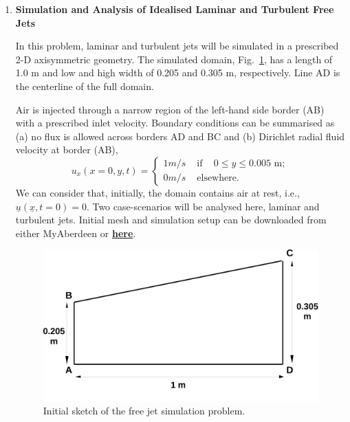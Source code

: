 \documentclass[12pts,a4paper,amsmath,amssymb,floatfix]{article}%
\renewcommand\leq{\leqslant}
\begin{document}
\begin{enumerate}[label=\bfseries Problem \arabic*:]
   \item\label{Problem1} {\bf Simulation and Analysis of Idealised Laminar and Turbulent Free Jets}

In this problem, laminar and turbulent jets will be simulated in a prescribed 2-D axisymmetric geometry. The simulated domain, Fig.~\ref{EG501V_Assignment:Sketch1}, has a length of 1.0 m and low and high width of 0.205 and 0.305 m, respectively. Line AD is the centerline of the full domain. 

          Air is injected through a narrow region of the left-hand side border (AB) with a prescribed inlet velocity. Boundary conditions can be summarised as (a) no flux is allowed across borders AD and BC and (b) Dirichlet radial fluid velocity at border (AB),
         \[ u_{x}( x=0, y, t) = \begin{cases}
             1 m/s & \text{ if } \;\;\;0\leq y\leq 0.005 \text{ m}; \\
             0 m/s & \text{ elsewhere.}
         \end{cases}\]  
         We can consider that, initially, the domain contains air at rest, i.e., $\underline{u}\left(\underline{x},t=0\right)=0$. Two case-scenarios will be analysed here, laminar and turbulent jets. Initial mesh and simulation setup can be downloaded from either MyAberdeen or \href{https://www.dropbox.com/s/d732xcpmyfkfqgy/FreeJet_Initial_Files.zip?dl=0}{{\bf here}}.

\begin{figure}[h]
\begin{center}
\includegraphics[width=15.cm,height=8.cm,clip]{./Pics/Sketch_Prob1b}
\caption{Initial sketch of the free jet simulation problem. }
\label{EG501V_Assignment:Sketch1}
\end{center}
\end{figure}


\end{enumerate}
\end{document}
